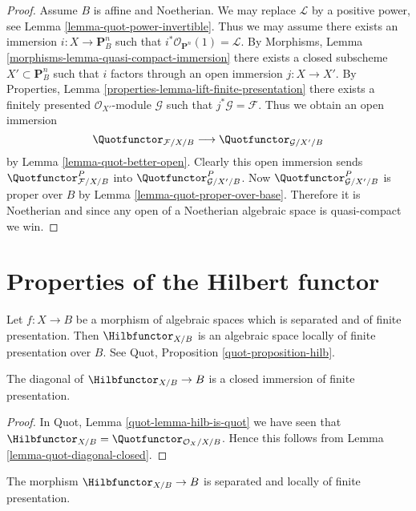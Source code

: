 \begin{proof}
\medskip\noindent
Assume $B$ is affine and Noetherian. We may replace $\mathcal{L}$
by a positive power, see Lemma \ref{lemma-quot-power-invertible}.
Thus we may assume there exists an immersion $i : X \to \mathbf{P}^n_B$
such that $i^*\mathcal{O}_{\mathbf{P}^n}(1) = \mathcal{L}$. By
Morphisms, Lemma \ref{morphisms-lemma-quasi-compact-immersion}
there exists a closed subscheme $X' \subset \mathbf{P}^n_B$
such that $i$ factors through an open immersion $j : X \to X'$.
By Properties, Lemma \ref{properties-lemma-lift-finite-presentation}
there exists a finitely presented $\mathcal{O}_{X'}$-module
$\mathcal{G}$ such that $j^*\mathcal{G} = \mathcal{F}$.
Thus we obtain an open immersion
$$
\Quotfunctor_{\mathcal{F}/X/B}
\longrightarrow
\Quotfunctor_{\mathcal{G}/X'/B}
$$
by Lemma \ref{lemma-quot-better-open}. Clearly this open immersion
sends $\Quotfunctor^P_{\mathcal{F}/X/B}$ into
$\Quotfunctor^P_{\mathcal{G}/X'/B}$. Now
$\Quotfunctor^P_{\mathcal{G}/X'/B}$ is proper over $B$ by
Lemma \ref{lemma-quot-proper-over-base}.
Therefore it is Noetherian and since any open of a Noetherian
algebraic space is quasi-compact we win.
\end{proof}




\section{Properties of the Hilbert functor}
\label{section-hilb}

\noindent
Let $f : X \to B$ be a morphism of algebraic spaces which is
separated and of finite presentation. Then
$\Hilbfunctor_{X/B}$ is an algebraic space locally of finite
presentation over $B$. See Quot, Proposition \ref{quot-proposition-hilb}.

\begin{lemma}
\label{lemma-hilb-diagonal-closed}
The diagonal of $\Hilbfunctor_{X/B} \to B$ is a closed immersion
of finite presentation.
\end{lemma}

\begin{proof}
In Quot, Lemma \ref{quot-lemma-hilb-is-quot} we have seen that
$\Hilbfunctor_{X/B} = \Quotfunctor_{\mathcal{O}_X/X/B}$.
Hence this follows from Lemma \ref{lemma-quot-diagonal-closed}.
\end{proof}

\begin{lemma}
\label{lemma-hilb-s-lfp}
The morphism $\Hilbfunctor_{X/B} \to B$ is separated
and locally of finite presentation.
\end{lemma}

